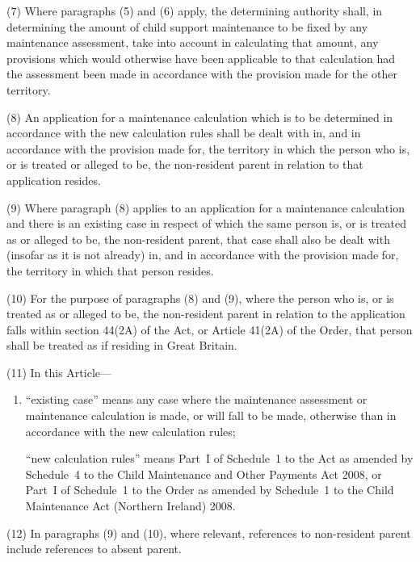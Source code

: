 \documentclass[12pt,a4paper]{article}
\begin{document}
(7) Where paragraphs (5) and (6) apply, the determining authority shall, in determining the amount of child support maintenance to be fixed by any maintenance assessment, take into account in calculating that amount, any provisions which would otherwise have been applicable to that calculation had the assessment been made in accordance with the provision made for the other territory.

(8) An application for a maintenance calculation which is to be determined in accordance with the new calculation rules shall be dealt with in, and in accordance with the provision made for, the territory in which the person who is, or is treated or alleged to be, the non-resident parent in relation to that application resides.

(9) Where paragraph (8) applies to an application for a maintenance calculation and there is an existing case in respect of which the same person is, or is treated as or alleged to be, the non-resident parent, that case shall also be dealt with (insofar as it is not already) in, and in accordance with the provision made for, the territory in which that person resides.

(10) For the purpose of paragraphs (8) and (9), where the person who is, or is treated as or alleged to be, the non-resident parent in relation to the application falls within section 44(2A) of the Act, or Article 41(2A) of the Order, that person shall be treated as if residing in Great Britain.

(11) In this Article---
\begin{enumerate}\item[]
``existing case'' means any case where the maintenance assessment or maintenance calculation is made, or will fall to be made, otherwise than in accordance with the new calculation rules;

``new calculation rules'' means Part~I of Schedule~1 to the Act as amended by Schedule~4 to the Child Maintenance and Other Payments Act 2008, or Part~I of Schedule~1 to the Order as amended by Schedule~1 to the Child Maintenance Act (Northern Ireland) 2008.
\end{enumerate}

(12) In paragraphs (9) and (10), where relevant, references to non-resident parent include references to absent parent.

\end{document}
